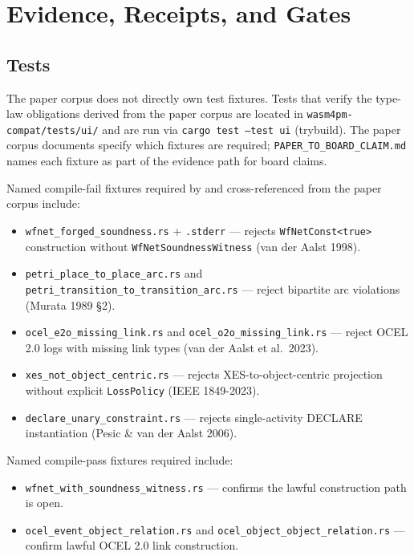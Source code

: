 
\section{Evidence, Receipts, and Gates}
\label{sec:sources-papers-evidence}

\subsection{Tests}
\label{sec:sources-papers-evidence-tests}

The paper corpus does not directly own test fixtures. Tests that verify the
type-law obligations derived from the paper corpus are located in
\texttt{wasm4pm-compat/tests/ui/} and are run via \texttt{cargo test --test ui}
(trybuild). The paper corpus documents specify which fixtures are required;
\texttt{PAPER\_TO\_BOARD\_CLAIM.md} names each fixture as part of the evidence
path for board claims.

Named compile-fail fixtures required by and cross-referenced from the paper
corpus include:

\begin{itemize}
  \item \texttt{wfnet\_forged\_soundness.rs} + \texttt{.stderr} --- rejects
    \texttt{WfNetConst<true>} construction without \texttt{WfNetSoundnessWitness}
    (van der Aalst 1998).
  \item \texttt{petri\_place\_to\_place\_arc.rs} and
    \texttt{petri\_transition\_to\_transition\_arc.rs} --- reject bipartite
    arc violations (Murata 1989 \S2).
  \item \texttt{ocel\_e2o\_missing\_link.rs} and \texttt{ocel\_o2o\_missing\_link.rs}
    --- reject OCEL 2.0 logs with missing link types (van der Aalst et al.\ 2023).
  \item \texttt{xes\_not\_object\_centric.rs} --- rejects XES-to-object-centric
    projection without explicit \texttt{LossPolicy} (IEEE 1849-2023).
  \item \texttt{declare\_unary\_constraint.rs} --- rejects single-activity
    DECLARE instantiation (Pesic \& van der Aalst 2006).
\end{itemize}

Named compile-pass fixtures required include:
\begin{itemize}
  \item \texttt{wfnet\_with\_soundness\_witness.rs} --- confirms the lawful
    construction path is open.
  \item \texttt{ocel\_event\_object\_relation.rs} and
    \texttt{ocel\_object\_object\_relation.rs} --- confirm lawful OCEL 2.0
    link construction.
\end{itemize}

